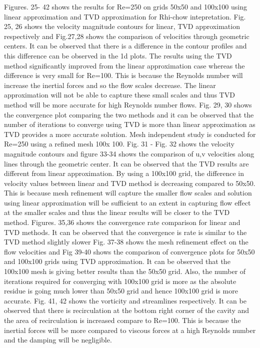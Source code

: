 \documentclass[12pt]{elsarticle}
\begin{document}
	Figures. 25- 42 shows the results for Re=250 on grids 50x50 and 100x100 using linear approximation and TVD approximation for Rhi-chow intepretation.\newline
	\newline
	Fig. 25, 26 shows the velocity magnitude contours for linear,  TVD approximation respectively and Fig.27,28 shows the comparison of velocities through geometric centers. It can be observed that there is a difference in the contour profiles and this difference can be observed in the 1d plots. The results using the TVD method significantly improved from the linear approximation case whereas the difference is very small for Re=100. This is because the Reynolds number will increase the inertial forces and so the flow scales decrease. The linear approximation will not be able to capture these small scales and thus TVD method will be more accurate for high Reynolds number flows.  Fig. 29, 30 shows the convergence plot comparing the two methods and it can be observed that the number of iterations to converge using TVD is more than linear approximation as TVD provides a more accurate solution.\newline
	\newline
	Mesh independent study is conducted for Re=250 using a refined mesh 100x 100. Fig. 31 - Fig. 32 shows the velocity magnitude contours and figure 33-34 shows the comparison of u,v velocities along lines through the geometric center. It can be observed that the TVD results are different from linear approximation. By using a 100x100 grid, the difference in velocity values between linear and TVD method is decreasing compared to 50x50. This is because mesh refinement will capture the smaller flow scales and solution using linear approximation will be sufficient to an extent in capturing flow effect at the smaller scales and thus the linear results will be closer to the TVD method. Figures. 35,36 shows the convergence rate comparison for linear and TVD methods. It can be observed that the convergence is rate is similar to the TVD method slightly slower\newline
	\newline
	Fig. 37-38 shows the mesh refinement effect on the flow velocities and Fig 39-40 shows the comparison of convergence plots for 50x50 and 100x100 grids using TVD approximation. It can be observed that the 100x100 mesh is giving better results than the 50x50 grid. Also, the number of iterations required for converging with 100x100 grid is more as the absolute residue is going much lower than 50x50 grid and hence 100x100 grid is more accurate. Fig. 41, 42 shows the vorticity and streamlines respectively. It can be observed that there is recirculation at the bottom right corner of the cavity and the area of recirculation is increased compare to Re=100. This is because the inertial forces will be more compared to viscous forces at a high Reynolds number and the damping will be negligible.
	
\end{document}
